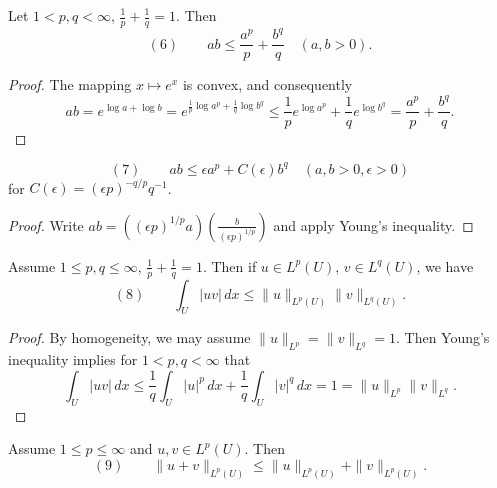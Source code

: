 \begin{lemma}
\label{lem:youngs-inequality}
Let $1 < p, q < \infty$, $\frac{1}{p} + \frac{1}{q} = 1$. Then
$$(6) \qquad ab \leq \frac{a^p}{p} + \frac{b^q}{q} \quad (a,b > 0).$$
\end{lemma}

\begin{proof}
The mapping $x \mapsto e^x$ is convex, and consequently
$$ab = e^{\log a + \log b} = e^{\frac{1}{p}\log a^p + \frac{1}{q}\log b^q} \leq \frac{1}{p}e^{\log a^p} + \frac{1}{q}e^{\log b^q} = \frac{a^p}{p} + \frac{b^q}{q}.$$
\end{proof}

\begin{lemma}
\label{lem:youngs-inequality-epsilon}
$$(7) \qquad ab \leq \epsilon a^p + C(\epsilon)b^q \quad (a,b > 0, \epsilon > 0)$$
for $C(\epsilon) = (\epsilon p)^{-q/p}q^{-1}$.
\end{lemma}

\begin{proof}
Write $ab = ((\epsilon p)^{1/p}a)\left(\frac{b}{(\epsilon p)^{1/p}}\right)$ and apply Young's inequality.
\end{proof}

\begin{lemma}
\label{lem:holders-inequality}
Assume $1 \leq p, q \leq \infty$, $\frac{1}{p} + \frac{1}{q} = 1$. Then if $u \in L^p(U)$, $v \in L^q(U)$, we have
$$(8) \qquad \int_U |uv|\,dx \leq \|u\|_{L^p(U)}\|v\|_{L^q(U)}.$$
\end{lemma}

\begin{proof}
By homogeneity, we may assume $\|u\|_{L^p} = \|v\|_{L^q} = 1$. Then Young's inequality implies for $1 < p, q < \infty$ that
$$\int_U |uv|\,dx \leq \frac{1}{q}\int_U |u|^p\,dx + \frac{1}{q}\int_U |v|^q\,dx = 1 = \|u\|_{L^p}\|v\|_{L^q}.$$
\end{proof}

\begin{lemma}
\label{lem:minkowskis-inequality}
Assume $1 \leq p \leq \infty$ and $u,v \in L^p(U)$. Then
$$(9) \qquad \|u + v\|_{L^p(U)} \leq \|u\|_{L^p(U)} + \|v\|_{L^p(U)}.$$
\end{lemma}

